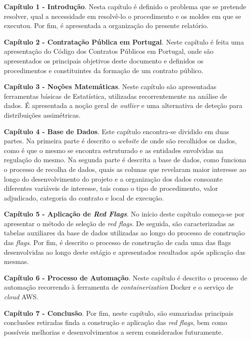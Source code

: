 \begin{my_itemize}


	\item \textbf{Capítulo 1 - Introdução}. Nesta capítulo é definido o problema que se pretende resolver, qual a necessidade em resolvê-lo o procedimento e os moldes em que se executou. Por fim, é apresentada a organização do presente relatório. 
	
	
	\item \textbf{Capítulo 2 - Contratação Pública em Portugal}. Neste capítulo é feita uma apresentação do Código dos Contratos Públicos em Portugal, onde são apresentados os principais objetivos deste documento e definidos os procedimentos e constituintes da formação de um contrato público.

	
	\item \textbf{Capítulo 3 - Noções Matemáticas}. Neste capítulo são apresentadas ferramentas básicas de Estatística, utilizadas recorrentemente na análise de dados. É apresentada a noção geral de \textit{outlier} e uma alternativa de deteção para distribuições assimétricas.

	
	\item \textbf{Capítulo 4 - Base de Dados}. Este capítulo encontra-se dividido em duas partes. Na primeira parte é descrito o \textit{website} de onde são recolhidos os dados, como é que o mesmo se encontra estruturado e as entidades envolvidas na regulação do mesmo. Na segunda parte é descrita a base de dados, como funciona o processo de recolha de dados, quais as colunas que revelaram maior interesse ao longo do desenvolvimento do projeto e a organização dos dados consoante diferentes variáveis de interesse, tais como o tipo de procedimento, valor adjudicado, categoria do contrato e local de execução.


	\item \textbf{Capítulo 5 - Aplicação de \textit{Red Flags}}. No início deste capítulo começa-se por apresentar o método de seleção de \textit{red flags}. De seguida, são caracterizadas as tabelas auxiliares da base de dados utilizadas ao longo do processo de construção das \textit{flags}. Por fim, é descrito o processo de construção de cada uma das flags desenvolvidas ao longo deste estágio e apresentados resultados após aplicação das mesmas.

	
	\item \textbf{Capítulo 6 - Processo de Automação}. Neste capítulo é descrito o processo de automação recorrendo à ferramenta de \textit{containerization} Docker e o serviço de \textit{cloud} AWS.

	
	\item \textbf{Capítulo 7 - Conclusão}. Por fim, neste capítulo, são sumariadas principais conclusões retiradas finda a construção e aplicação das \textit{red flags}, bem como possíveis melhorias e desenvolvimentos a serem considerados futuramente. 


\end{my_itemize}




